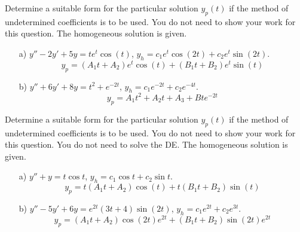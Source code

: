 \ifnum {}
\question[3] 
Determine a suitable form for the particular solution $y_p(t)$ if the method of undetermined coeﬃcients is to be used. You do not need to show your work for this question. The homogeneous solution is given. 
\begin{enumerate}
    \item[a)] $y'' - 2y' + 5y =  te^t\cos(t)$, $y_h = c_1e^{t}\cos(2t) + c_2 e^{t}\sin(2t)$. 
    \ifnum {} {\color{DarkBlue} \\
    $$y_p =  (A_1t+A_2)e^{t}\cos(t) +  (B_1t+B_2)e^{t}\sin(t) $$
    } 
    \else 
    \vspace{2cm}
    \fi       
    \item[b)] $y''+6y'+8y = t^2+e^{-2t}$, $y_h = c_1e^{-2t} + c_2 e^{-4t}$. 
    \ifnum {} {\color{DarkBlue} \\
    $$y_p = A_1t^2+A_2t+A_3 + Bte^{-2t}$$
    } 
    \else 
    \vspace{2cm}
    \fi    
\end{enumerate}
\fi





\ifnum {}
\question[3] 
Determine a suitable form for the particular solution $y_p(t)$ if the method of undetermined coeﬃcients is to be used. You do not need to show your work for this question. You do not need to solve the DE. The homogeneous solution is given. 
\begin{enumerate}
    \item[a)] $y''+y = t\cos t$, $y_h = c_1\cos t + c_2 \sin t$.
    \ifnum {} {\color{DarkBlue} \\
    $$y_p =  t(A_1t+A_2)\cos(t) +  t(B_1t+B_2)\sin(t) $$
    } 
    \else 
    \vspace{6cm}
    \fi       
    \item[b)] $y'' - 5y' + 6y =  e^{2t} (3t + 4) \sin(2t)$, $y_h = c_1e^{2t} + c_2 e^{3t}$. 
    \ifnum {} {\color{DarkBlue} \\
    $$y_p = (A_1t+A_2)\cos(2t)e^{2t} + (B_1t+B_2)\sin(2t)e^{2t}$$
    } 
    \else 
    \vspace{6cm}
    \fi    
\end{enumerate}
\fi


